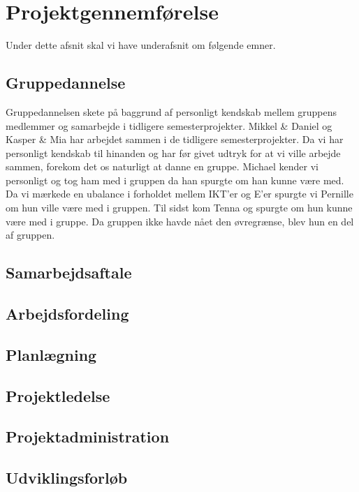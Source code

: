 \chapter{Projektgennemførelse}

Under dette afsnit skal vi have underafsnit om følgende emner.

\section{Gruppedannelse}
	Gruppedannelsen skete på baggrund af personligt kendskab mellem gruppens medlemmer og samarbejde i tidligere semesterprojekter. Mikkel \& Daniel og Kasper \& Mia har arbejdet sammen i de tidligere semesterprojekter. Da vi har personligt kendskab til hinanden og har før givet udtryk for at vi ville arbejde sammen, forekom det os naturligt at danne en gruppe. Michael kender vi personligt og tog ham med i gruppen da han spurgte om han kunne være med. Da vi mærkede en ubalance i forholdet mellem IKT'er og E'er spurgte vi Pernille om hun ville være med i gruppen. Til sidst kom Tenna og spurgte om hun kunne være med i gruppe. Da gruppen ikke havde nået den øvregrænse, blev hun en del af gruppen. 
\section{Samarbejdsaftale}

\section{Arbejdsfordeling}

\section{Planlægning}

\section{Projektledelse}

\section{Projektadministration}

\section{Udviklingsforløb}
